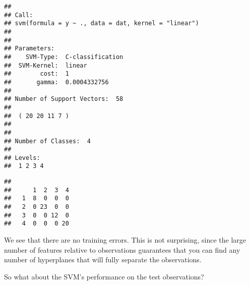 \documentclass[]{article}
\newenvironment{Shaded}{\begin{snugshade}}{\end{snugshade}}
\newcommand{\KeywordTok}[1]{\textcolor[rgb]{0.13,0.29,0.53}{\textbf{#1}}}
\newcommand{\DataTypeTok}[1]{\textcolor[rgb]{0.13,0.29,0.53}{#1}}
\newcommand{\StringTok}[1]{\textcolor[rgb]{0.31,0.60,0.02}{#1}}
\newcommand{\CommentTok}[1]{\textcolor[rgb]{0.56,0.35,0.01}{\textit{#1}}}
\newcommand{\OperatorTok}[1]{\textcolor[rgb]{0.81,0.36,0.00}{\textbf{#1}}}
\newcommand{\NormalTok}[1]{#1}
\begin{document}
\begin{verbatim}
## 
## Call:
## svm(formula = y ~ ., data = dat, kernel = "linear")
## 
## 
## Parameters:
##    SVM-Type:  C-classification 
##  SVM-Kernel:  linear 
##        cost:  1 
##       gamma:  0.0004332756 
## 
## Number of Support Vectors:  58
## 
##  ( 20 20 11 7 )
## 
## 
## Number of Classes:  4 
## 
## Levels: 
##  1 2 3 4
\end{verbatim}

\begin{Shaded}
\end{Shaded}

\begin{verbatim}
##    
##      1  2  3  4
##   1  8  0  0  0
##   2  0 23  0  0
##   3  0  0 12  0
##   4  0  0  0 20
\end{verbatim}

We see that there are no training errors. This is not surprising, since
the large number of features relative to observations guarantees that
you can find any number of hyperplanes that will fully separate the
observations.

So what about the SVM's performance on the test observations?

\begin{Shaded}
\end{Shaded}
\end{document}
